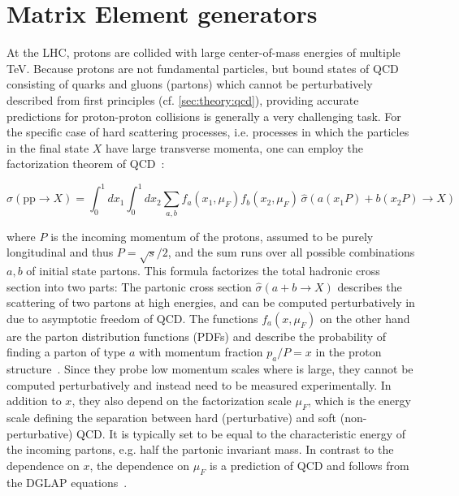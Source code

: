 \section{Matrix Element generators}
\label{sec:mc:me}


At the LHC, protons are collided with large center-of-mass energies of multiple TeV. Because protons are not fundamental particles, but bound states of QCD consisting of quarks and gluons (partons) which cannot be perturbatively described from first principles (cf. \cref{sec:theory:qcd}), providing accurate predictions for proton-proton collisions is generally a very challenging task. For the specific case of hard scattering processes, i.e. processes in which the particles in the final state $X$ have large transverse momenta, one can employ the factorization theorem of QCD~\cite{Peskin:1995ev}:

\begin{equation}
\label{eq:mc:sigmahad}
    \sigma (\mathrm{pp} \rightarrow X) = \int_{0}^{1} dx_1 \int_{0}^{1} dx_2 \sum_ {a,b} f_a (x_1, \mu_F) f_b (x_2, \mu_F) \, \hat{\sigma} (a (x_1 P) + b (x_2 P) \rightarrow X)
\end{equation}

\noindent where $P$ is the incoming momentum of the protons, assumed to be purely longitudinal and thus $P = \sqrt{s}/2$, and the sum runs over all possible combinations $a,b$ of initial state partons. This formula factorizes the total hadronic cross section into two parts: The partonic cross section $\hat{\sigma} (a + b \rightarrow X)$ describes the scattering of two partons at high energies, and can be computed perturbatively in \alphas due to asymptotic freedom of QCD. The functions $f_a(x, \mu_F)$  on the other hand are the parton distribution functions (PDFs) and describe the probability of finding a parton of type $a$ with momentum fraction $p_a / P = x$ in the proton structure~\cite{Peskin:1995ev}. Since they probe low momentum scales where \alphas is large, they cannot be computed perturbatively and instead need to be measured experimentally. In addition to $x$, they also depend on the factorization scale $\mu_F$, which is the energy scale defining the separation between hard (perturbative) and soft (non-perturbative) QCD. It is typically set to be equal to the characteristic energy of the incoming partons, e.g. half the partonic invariant mass. In contrast to the dependence on $x$, the dependence on $\mu_F$ is a prediction of QCD and follows from the DGLAP equations~\cite{Altarelli:1977zs,Skands:2012ts}.

